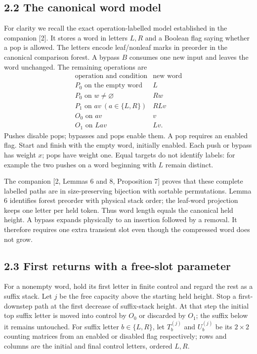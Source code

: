 \documentclass[11pt,letterpaper]{article}
\begin{document}
\subsection{2.2 The canonical word
model}\label{the-canonical-word-model}

For clarity we recall the exact operation-labelled model established in
the companion {[}2{]}. It stores a word in letters \(L,R\) and a Boolean
flag saying whether a pop is allowed. The letters encode leaf/nonleaf
marks in preorder in the canonical comparison forest. A bypass \(B\)
consumes one new input and leaves the word unchanged. The remaining
operations are \[
\begin{array}{c|c}
\text{operation and condition}&\text{new word}\\\hline
P_0\text{ on the empty word}&L\\
P_0\text{ on }w\ne\varnothing&Rw\\
P_1\text{ on }av\ (a\in\{L,R\})&RLv\\
O_0\text{ on }av&v\\
O_1\text{ on }Lav&Lv.
\end{array}
\] Pushes disable pops; bypasses and pops enable them. A pop requires an
enabled flag. Start and finish with the empty word, initially enabled.
Each push or bypass has weight \(x\); pops have weight one. Equal
targets do not identify labels: for example the two pushes on a word
beginning with \(L\) remain distinct.

The companion {[}2, Lemmas 6 and 8, Proposition 7{]} proves that these
complete labelled paths are in size-preserving bijection with sortable
permutations. Lemma 6 identifies forest preorder with physical stack
order; the leaf-word projection keeps one letter per held token. Thus
word length equals the canonical held height. A bypass expands
physically to an insertion followed by a removal. It therefore requires
one extra transient slot even though the compressed word does not grow.

\subsection{2.3 First returns with a free-slot
parameter}\label{first-returns-with-a-free-slot-parameter}

For a nonempty word, hold its first letter in finite control and regard
the rest as a suffix stack. Let \(j\) be the free capacity above the
starting held height. Stop a first-downstep path at the first decrease
of suffix-stack height. At that step the initial top suffix letter is
moved into control by \(O_0\) or discarded by \(O_1\); the suffix below
it remains untouched. For suffix letter \(b\in\{L,R\}\), let
\(T_b^{(j)}\) and \(U_b^{(j)}\) be its \(2\times2\) counting matrices
from an enabled or disabled flag respectively; rows and columns are the
initial and final control letters, ordered \(L,R\).
\end{document}
